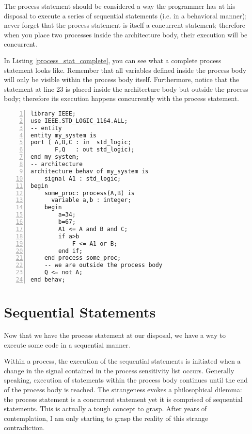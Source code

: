 The process statement should be considered a way the programmer has at his disposal to execute a series of sequential statements (i.e. in a behavioral manner); never forget that the process statement is itself a concurrent statement; therefore when you place two processes inside the architecture body, their execution will be concurrent.

In Listing \ref{process_stat_complete}, you can see what a complete process statement looks like. Remember that all variables defined inside the process body will only be visible within the process body itself. Furthermore, notice that the statement at line 23 is placed inside the architecture body but outside the process body; therefore its execution happens concurrently with the process statement.
\null\newpage
\begin{lstlisting}[numbers=left,label=process_stat_complete, caption=Use of the process statement.]
library IEEE;
use IEEE.STD_LOGIC_1164.ALL;
-- entity
entity my_system is
port ( A,B,C : in  std_logic;
       F,Q   : out std_logic);
end my_system;
-- architecture
architecture behav of my_system is
	signal A1 : std_logic;
begin
	some_proc: process(A,B) is
	  variable a,b : integer;
	begin
		a=34;
		b=67;
		A1 <= A and B and C;
		if a>b
			F <= A1 or B;
		end if;
	end process some_proc;
	-- we are outside the process body	
	Q <= not A;
end behav;
\end{lstlisting}

\section{Sequential Statements}
Now that we have the process statement at our disposal, we have a way to execute some code in a sequential manner.

Within a process, the execution of the sequential statements is initiated when a change in the signal contained in the process sensitivity list occurs. Generally speaking, execution of statements within the process body continues until the end of the process body is reached. The strangeness evokes a philosophical dilemma: the process statement is a concurrent statement yet it is comprised of sequential statements. This is actually a tough concept to grasp. After years of contemplation, I am only starting to grasp the reality of this strange contradiction. 

